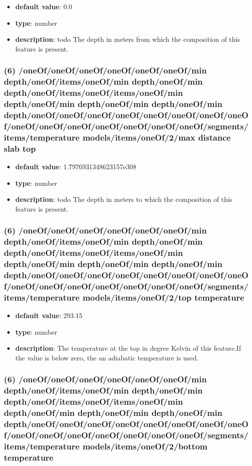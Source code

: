 \begin{itemize}[leftmargin=6em]\item {\bf default value}: 0.0
\item {\bf type}: number
\item {\bf description}: todo The depth in meters from which the composition of this feature is present.
\end{itemize}\subsubsection{(6) /oneOf/oneOf/oneOf/oneOf/oneOf/oneOf/min depth/oneOf/items/oneOf/min depth/oneOf/min depth/oneOf/items/oneOf/items/oneOf/min depth/oneOf/min depth/oneOf/min depth/oneOf/min depth/oneOf/oneOf/oneOf/oneOf/oneOf/oneOf/oneOf/oneOf/oneOf/oneOf/oneOf/oneOf/oneOf/oneOf/oneOf/segments/items/temperature models/items/oneOf/2/max distance slab top}
\begin{itemize}[leftmargin=6em]\item {\bf default value}: 1.7976931348623157e308
\item {\bf type}: number
\item {\bf description}: todo The depth in meters to which the composition of this feature is present.
\end{itemize}\subsubsection{(6) /oneOf/oneOf/oneOf/oneOf/oneOf/oneOf/min depth/oneOf/items/oneOf/min depth/oneOf/min depth/oneOf/items/oneOf/items/oneOf/min depth/oneOf/min depth/oneOf/min depth/oneOf/min depth/oneOf/oneOf/oneOf/oneOf/oneOf/oneOf/oneOf/oneOf/oneOf/oneOf/oneOf/oneOf/oneOf/oneOf/oneOf/segments/items/temperature models/items/oneOf/2/top temperature}
\begin{itemize}[leftmargin=6em]\item {\bf default value}: 293.15
\item {\bf type}: number
\item {\bf description}: The temperature at the top in degree Kelvin of this feature.If the value is below zero, the an adiabatic temperature is used.
\end{itemize}\subsubsection{(6) /oneOf/oneOf/oneOf/oneOf/oneOf/oneOf/min depth/oneOf/items/oneOf/min depth/oneOf/min depth/oneOf/items/oneOf/items/oneOf/min depth/oneOf/min depth/oneOf/min depth/oneOf/min depth/oneOf/oneOf/oneOf/oneOf/oneOf/oneOf/oneOf/oneOf/oneOf/oneOf/oneOf/oneOf/oneOf/oneOf/oneOf/segments/items/temperature models/items/oneOf/2/bottom temperature}
